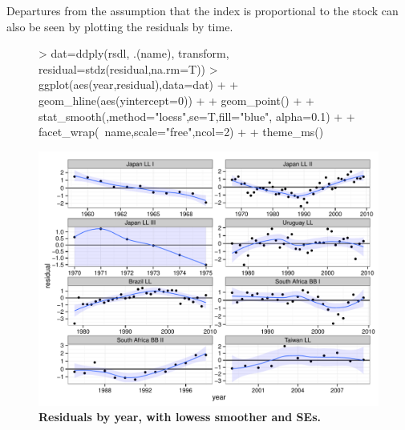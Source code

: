 \documentclass[shortnames,nojss,article]{jss}
\begin{document}
Departures from the assumption that the index is proportional to the stock can also be seen by plotting the residuals by time. 
\begin{figure}\begin{center}
\begin{Schunk}
\begin{Sinput}
> dat=ddply(rsdl, .(name), transform, residual=stdz(residual,na.rm=T))
> ggplot(aes(year,residual),data=dat) +
+   geom_hline(aes(yintercept=0))      +
+   geom_point()                       +
+   stat_smooth(,method="loess",se=T,fill="blue", alpha=0.1)  +
+   facet_wrap(~name,scale="free",ncol=2)   +
+              theme_ms() 
\end{Sinput}
\end{Schunk}
\includegraphics{diags-019}
\caption{\bf{Residuals by year, with lowess smoother and SEs.}}
\label{residual:2}
\end{center}
\end{figure}
\end{document}
